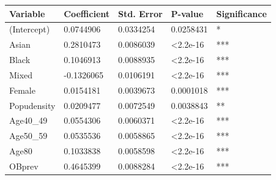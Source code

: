 \begin{table}[]
\centering
\begin{tabular}{|lllll|}
\hline
\multicolumn{1}{|l|}{\textbf{Variable}} & \multicolumn{1}{l|}{\textbf{Coefficient}} & \multicolumn{1}{l|}{\textbf{Std. Error}} & \multicolumn{1}{l|}{\textbf{P-value}}  & \textbf{Significance} \\ \hline
\multicolumn{1}{|l|}{(Intercept)}       & \multicolumn{1}{l|}{0.0744906}            & \multicolumn{1}{l|}{0.0334254}           & \multicolumn{1}{l|}{0.0258431}         & *                     \\ \hline
\multicolumn{1}{|l|}{Asian}             & \multicolumn{1}{l|}{0.2810473}            & \multicolumn{1}{l|}{0.0086039}           & \multicolumn{1}{l|}{\textless 2.2e-16} & ***                   \\ \hline
\multicolumn{1}{|l|}{Black}             & \multicolumn{1}{l|}{0.1046913}            & \multicolumn{1}{l|}{0.0088935}           & \multicolumn{1}{l|}{\textless 2.2e-16} & ***                   \\ \hline
\multicolumn{1}{|l|}{Mixed}             & \multicolumn{1}{l|}{-0.1326065}           & \multicolumn{1}{l|}{0.0106191}           & \multicolumn{1}{l|}{\textless 2.2e-16} & ***                   \\ \hline
\multicolumn{1}{|l|}{Female}            & \multicolumn{1}{l|}{0.0154181}            & \multicolumn{1}{l|}{0.0039673}           & \multicolumn{1}{l|}{0.0001018}         & ***                   \\ \hline
\multicolumn{1}{|l|}{Popudensity}       & \multicolumn{1}{l|}{0.0209477}            & \multicolumn{1}{l|}{0.0072549}           & \multicolumn{1}{l|}{0.0038843}         & **                    \\ \hline
\multicolumn{1}{|l|}{Age40\_49}         & \multicolumn{1}{l|}{0.0554306}            & \multicolumn{1}{l|}{0.0060371}           & \multicolumn{1}{l|}{\textless 2.2e-16} & ***                   \\ \hline
\multicolumn{1}{|l|}{Age50\_59}         & \multicolumn{1}{l|}{0.0535536}            & \multicolumn{1}{l|}{0.0058865}           & \multicolumn{1}{l|}{\textless 2.2e-16} & ***                   \\ \hline
\multicolumn{1}{|l|}{Age80}             & \multicolumn{1}{l|}{0.1033838}            & \multicolumn{1}{l|}{0.0058598}           & \multicolumn{1}{l|}{\textless 2.2e-16} & ***                   \\ \hline
\multicolumn{1}{|l|}{OBprev}            & \multicolumn{1}{l|}{0.4645399}            & \multicolumn{1}{l|}{0.0088284}           & \multicolumn{1}{l|}{\textless 2.2e-16} & ***                   \\ \hline

\end{tabular}
\end{table}
